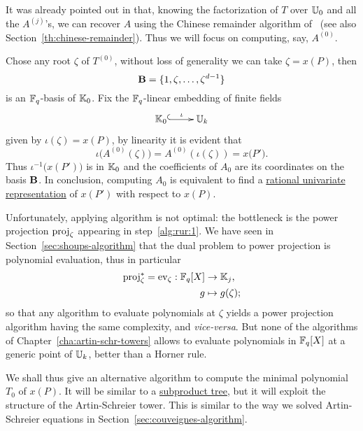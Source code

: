 It was already pointed out in \cite[$\S$2.3]{couveignes96} that,
knowing the factorization of $T$ over $\mathbb{U}_0$ and all the $A^{(j)}$'s,
we can recover $A$ using the Chinese remainder algorithm
of~\cite[$\S10$]{vzGG} (see also
Section~\ref{th:chinese-remainder}). Thus we will focus on computing,
say, $A^{(0)}$.

Chose any root $\zeta$ of $T^{(0)}$, without loss of generality we
can take $\zeta=x(P)$, then
\begin{equation}
  \label{eq:188}
  \mathbf{B}=\{1,\zeta,\ldots,\zeta^{d-1}\}  
\end{equation}
is an $\mathbb{F}_q$-basis of $\mathbb{K}_0$.  Fix the $\mathbb{F}_q$-linear embedding of
finite fields
\begin{equation}
  \label{eq:embed}
  \xymatrix{
    \K_0 \ar@{^{(}->}[r]^-\iota & \U_k
  }
\end{equation}
given by $\iota(\zeta) = x(P)$, by linearity it is evident that
\begin{equation}
  \iota\bigl(A^{(0)}(\zeta)\bigr) = A^{(0)}\left(\iota(\zeta)\right)=x\bigl(P'\bigr)
  \text{.}
\end{equation}
Thus $\iota^{-1}\bigl(x(P')\bigr)$ is in $\mathbb{K}_0$ and the coefficients
of $A_0$ are its coordinates on the basis $\mathbf{B}$. In conclusion,
computing $A_0$ is equivalent to find a \hyperref[eq:22]{rational
  univariate representation} of $x(P')$ with respect to $x(P)$.

Unfortunately, applying algorithm \hyperref[alg:rur]{} is not optimal: the
bottleneck is the power projection $\operatorname{proj}_\zeta$ appearing in
step~\ref{alg:rur:1}. We have seen in
Section~\ref{sec:shoups-algorithm} that the dual problem to power
projection is polynomial evaluation, thus in particular
\begin{equation}
  \label{eq:189}
  \begin{aligned}
    \operatorname{proj}_\zeta^\ast = \operatorname{ev}_\zeta : \mathbb{F}_q[X] &\rightarrow \mathbb{K}_j\text{,}\\
    g &\mapsto g(\zeta)\text{;}
  \end{aligned}
\end{equation}
so that any algorithm to evaluate polynomials at $\zeta$ yields a
power projection algorithm having the same complexity, and
\emph{vice-versa}. But none of the algorithms of
Chapter~\ref{cha:artin-schr-towers} allows to evaluate polynomials in
$\mathbb{F}_q[X]$ at a generic point of $\mathbb{U}_k$, better than a Horner rule.

We shall thus give an alternative algorithm to compute the minimal
polynomial $T_0$ of $x(P)$. It will be similar to a
\hyperref[sec:chin-rema-algor]{subproduct tree}, but it will exploit
the structure of the Artin-Schreier tower. This is similar to the way
we solved Artin-Schreier equations in
Section~\ref{sec:couveignes-algorithm}.



